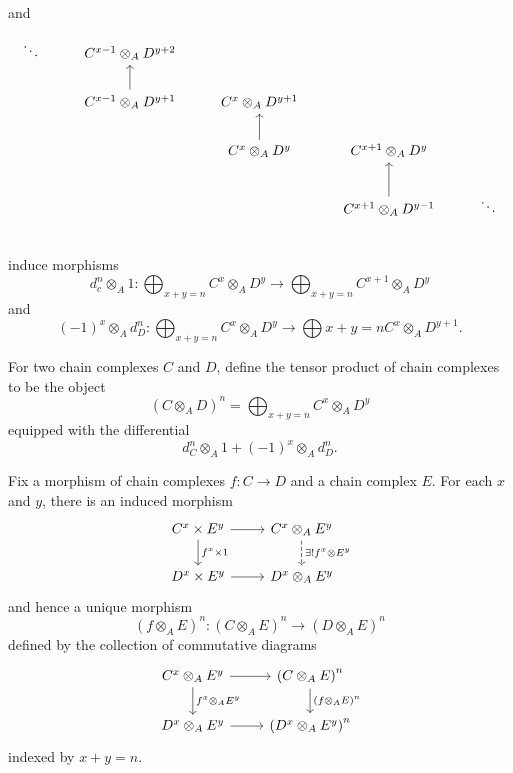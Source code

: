 \documentclass[dissertation.tex]{subfiles}
\begin{document}
and
$$\begin{tikzcd}
  \ddots
  & C^{x - 1} \otimes_A D^{y + 2}\\
  & C^{x - 1} \otimes_A D^{y + 1} \arrow{u}& C^x \otimes_A D^{y + 1}\\
  & & C^x \otimes_A D^y \arrow{u} & C^{x + 1} \otimes_A D^y\\
  & & & C^{x + 1} \otimes_A D^{y - 1}\arrow{u} & \ddots\\
\end{tikzcd}$$
induce morphisms
$$d^n_c \otimes_A 1 \colon \bigoplus_{x + y = n} C^x \otimes_A D^y \to \bigoplus_{x + y = n} C^{x+1} \otimes_A D^{y}$$
and
$$(-1)^x \otimes_A d^n_D \colon \bigoplus_{x + y = n} C^x \otimes_A D^y \to \bigoplus{x + y = n} C^{x} \otimes_A D^{y + 1}.$$
\begin{defn}
  For two chain complexes $C$ and $D$, define the tensor product of chain complexes to be the object
  $$\left(C \otimes_A D\right)^n = \bigoplus_{x + y = n}C^x \otimes_A D^y$$
  equipped with the differential
  $$d^n_C \otimes_A 1 + (-1)^x \otimes_A d^n_D.$$
\end{defn}

Fix a morphism of chain complexes $f \colon C \to D$ and a chain complex $E$.
For each $x$ and $y$, there is an induced morphism
$$\begin{tikzcd}
  C^x \times E^y \arrow{r}\arrow{d}{f^x \times 1} & C^x \otimes_A E^y \arrow[dashed]{d}{\exists ! f^x \otimes E^y}\\
  D^x \times E^y \arrow{r} & D^x \otimes_A E^y
\end{tikzcd}$$
and hence a unique morphism
$$\left(f \otimes_A E\right)^n \colon \left(C \otimes_A E\right)^n \to \left(D \otimes_A E\right)^n$$
defined by the collection of commutative diagrams
$$\begin{tikzcd}
  C^x \otimes_A E^y \arrow{r}\arrow{d}{f^x \otimes_A E^y} & \left(C \otimes_A E\right)^n \arrow{d}{(f \otimes_A E)^n}\\
  D^x \otimes_A E^y \arrow{r} & \left(D^x \otimes_A E^y\right)^n
\end{tikzcd}$$
indexed by $x + y = n$.
\end{document}
